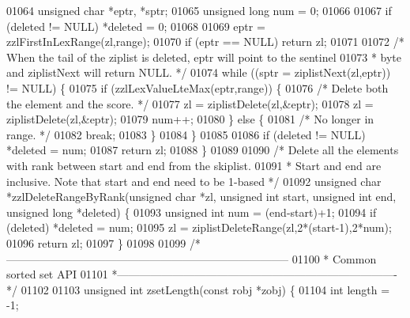 \begin{DoxyCode}
01064     \textcolor{keywordtype}{unsigned} \textcolor{keywordtype}{char} *eptr, *sptr;
01065     \textcolor{keywordtype}{unsigned} \textcolor{keywordtype}{long} num = 0;
01066 
01067     \textcolor{keywordflow}{if} (deleted != NULL) *deleted = 0;
01068 
01069     eptr = zzlFirstInLexRange(zl,range);
01070     \textcolor{keywordflow}{if} (eptr == NULL) \textcolor{keywordflow}{return} zl;
01071 
01072     \textcolor{comment}{/* When the tail of the ziplist is deleted, eptr will point to the sentinel}
01073 \textcolor{comment}{     * byte and ziplistNext will return NULL. */}
01074     \textcolor{keywordflow}{while} ((sptr = ziplistNext(zl,eptr)) != NULL) \{
01075         \textcolor{keywordflow}{if} (zzlLexValueLteMax(eptr,range)) \{
01076             \textcolor{comment}{/* Delete both the element and the score. */}
01077             zl = ziplistDelete(zl,&eptr);
01078             zl = ziplistDelete(zl,&eptr);
01079             num++;
01080         \} \textcolor{keywordflow}{else} \{
01081             \textcolor{comment}{/* No longer in range. */}
01082             \textcolor{keywordflow}{break};
01083         \}
01084     \}
01085 
01086     \textcolor{keywordflow}{if} (deleted != NULL) *deleted = num;
01087     \textcolor{keywordflow}{return} zl;
01088 \}
01089 
01090 \textcolor{comment}{/* Delete all the elements with rank between start and end from the skiplist.}
01091 \textcolor{comment}{ * Start and end are inclusive. Note that start and end need to be 1-based */}
01092 \textcolor{keywordtype}{unsigned} \textcolor{keywordtype}{char} *zzlDeleteRangeByRank(\textcolor{keywordtype}{unsigned} \textcolor{keywordtype}{char} *zl, \textcolor{keywordtype}{unsigned} \textcolor{keywordtype}{int} start, \textcolor{keywordtype}{unsigned} \textcolor{keywordtype}{int} end, \textcolor{keywordtype}{unsigned} \textcolor{keywordtype}{
      long} *deleted) \{
01093     \textcolor{keywordtype}{unsigned} \textcolor{keywordtype}{int} num = (end-start)+1;
01094     \textcolor{keywordflow}{if} (deleted) *deleted = num;
01095     zl = ziplistDeleteRange(zl,2*(start-1),2*num);
01096     \textcolor{keywordflow}{return} zl;
01097 \}
01098 
01099 \textcolor{comment}{/*-----------------------------------------------------------------------------}
01100 \textcolor{comment}{ * Common sorted set API}
01101 \textcolor{comment}{ *----------------------------------------------------------------------------*/}
01102 
01103 \textcolor{keywordtype}{unsigned} \textcolor{keywordtype}{int} zsetLength(\textcolor{keyword}{const} robj *zobj) \{
01104     \textcolor{keywordtype}{int} length = -1;

\end{DoxyCode}
